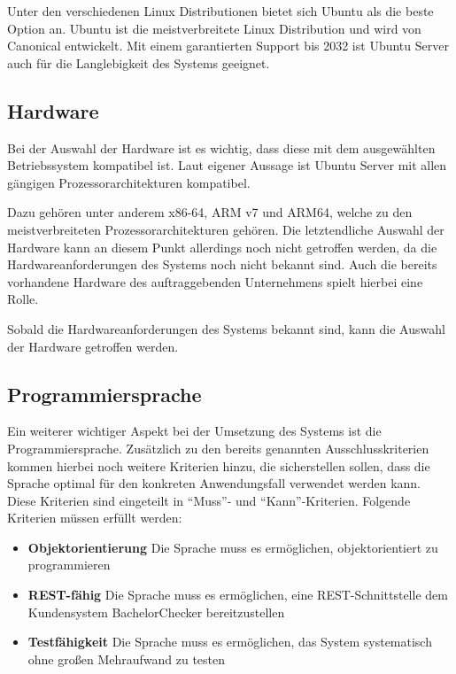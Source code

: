 Unter den verschiedenen Linux Distributionen bietet sich Ubuntu als die beste Option an.
Ubuntu ist die meistverbreitete Linux Distribution und wird von Canonical entwickelt.
Mit einem garantierten Support bis 2032 ist Ubuntu Server auch für die Langlebigkeit des Systems geeignet\autocite{ubuntu}.

\subsection{Hardware}\label{subsec:hardware}
Bei der Auswahl der Hardware ist es wichtig, dass diese mit dem ausgewählten Betriebssystem kompatibel ist.
Laut eigener Aussage ist Ubuntu Server mit allen gängigen Prozessorarchitekturen kompatibel\autocite{ubuntu}.

Dazu gehören unter anderem x86-64, ARM v7 und ARM64, welche zu den meistverbreiteten Prozessorarchitekturen gehören.
Die letztendliche Auswahl der Hardware kann an diesem Punkt allerdings noch nicht getroffen werden,
da die Hardwareanforderungen des Systems noch nicht bekannt sind.
Auch die bereits vorhandene Hardware des auftraggebenden Unternehmens spielt hierbei eine Rolle.

Sobald die Hardwareanforderungen des Systems bekannt sind, kann die Auswahl der Hardware getroffen werden.

\subsection{Programmiersprache}\label{subsec:programmiersprache}
Ein weiterer wichtiger Aspekt bei der Umsetzung des Systems ist die Programmiersprache.
Zusätzlich zu den bereits genannten Ausschlusskriterien kommen hierbei noch weitere Kriterien hinzu,
die sicherstellen sollen, dass die Sprache optimal für den konkreten Anwendungsfall verwendet werden kann.
Diese Kriterien sind eingeteilt in “Muss”- und “Kann”-Kriterien.
Folgende Kriterien müssen erfüllt werden:
\begin{itemize}
    \item \textbf{Objektorientierung} Die Sprache muss es ermöglichen, objektorientiert zu programmieren
    \item \textbf{REST-fähig} Die Sprache muss es ermöglichen, eine REST-Schnittstelle dem Kundensystem BachelorChecker bereitzustellen
    \item \textbf{Testfähigkeit} Die Sprache muss es ermöglichen, das System systematisch ohne großen Mehraufwand zu testen
\end{itemize}

